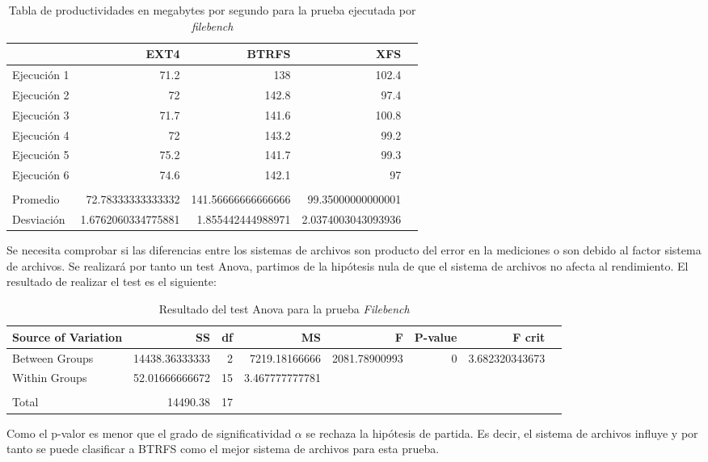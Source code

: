 \begin{table}[!htp]\centering
\scriptsize
\begin{tabular}{lrrrr}\toprule
&EXT4 &BTRFS &XFS \\\midrule
Ejecución 1 &71.2 &138 &102.4 \\
Ejecución 2 &72 &142.8 &97.4 \\
Ejecución 3 &71.7 &141.6 &100.8 \\
Ejecución 4 &72 &143.2 &99.2 \\
Ejecución 5 &75.2 &141.7 &99.3 \\
Ejecución 6 &74.6 &142.1 &97 \\
& & & \\
Promedio &72.78333333333332 &141.56666666666666 &99.35000000000001 \\
Desviación &1.6762060334775881 &1.855442444988971 &2.0374003043093936 \\
\bottomrule
\end{tabular}
\caption{Tabla de productividades en megabytes por segundo para la prueba ejecutada por \textit{filebench}}\label{tab:filebench_tabla}
\end{table}

Se necesita comprobar si las diferencias entre los sistemas de archivos son producto del error en la mediciones o son debido al factor sistema de archivos. Se realizará por tanto un test Anova, partimos de la hipótesis nula de que el sistema de archivos no afecta al rendimiento. El resultado de realizar el test es el siguiente: 

\begin{table}[H]\centering

\scriptsize
\begin{tabular}{lrrrrrrr}\toprule
Source of Variation &SS &df &MS &F &P-value &F crit \\\midrule
Between Groups &14438.36333333 &2 &7219.18166666 &2081.78900993 &0 &3.682320343673 \\
Within Groups &52.01666666672 &15 &3.467777777781 & & & \\
& & & & & & \\
Total &14490.38 &17 & & & & \\
\bottomrule
\end{tabular}
\caption{Resultado del test Anova para la prueba \textit{Filebench}}\label{tab: }
\end{table}

Como el p-valor es menor que el grado de significatividad $\alpha$ se rechaza la hipótesis de partida. Es decir, el sistema de archivos influye y por tanto se puede clasificar a BTRFS como el mejor sistema de archivos para esta prueba.

